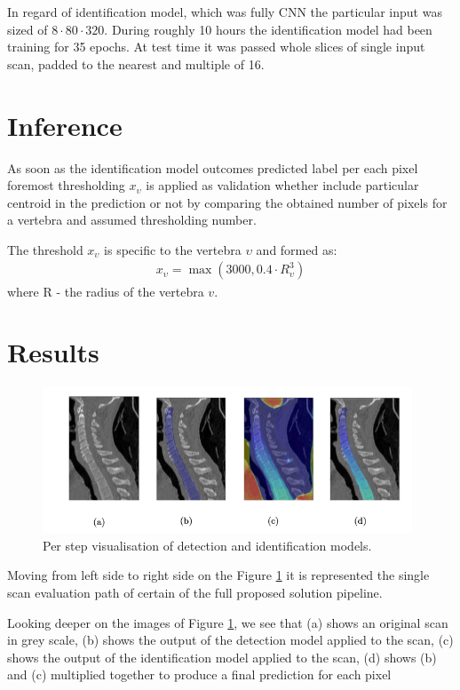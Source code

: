In regard of identification model, which was fully CNN the particular input was sized of $8 \cdot 80 \cdot 320$. During roughly 10 hours the identification model had been training for 35 epochs. At test time it was passed whole slices of single input scan, padded to the nearest and multiple of 16.

\section{Inference}
As soon as the identification model outcomes predicted label per each pixel foremost thresholding $x_\upsilon$ is applied as validation whether include particular centroid in the prediction or not by comparing the obtained  number of pixels for a vertebra and assumed thresholding number.

The threshold $x_\upsilon$ is specific to the vertebra $\upsilon$ and formed as:
\begin{align*}
  x_\upsilon = \max(3000, 0.4 \cdot R_\upsilon^3) 
\end{align*}
where R - the radius of the vertebra $v$.

\section{Results}
\begin{figure}[h]
    \centering \includegraphics[width=11cm]{images/detection_identification_steps.png}
    \caption {Per step visualisation of detection and identification  models.}
    \label{fig:step_step_predictions}
\end{figure}
Moving from left side to right side on the Figure \ref{fig:step_step_predictions} it is represented the single scan evaluation path of certain of the full proposed solution pipeline. 

Looking deeper on the images of 
Figure \ref{fig:step_step_predictions}, we see that (a) shows an original scan in grey scale, (b) shows the output of the detection model applied to the scan, (c) shows the output of the identification model applied to the scan, (d) shows (b) and (c) multiplied together to produce a final prediction for each pixel

